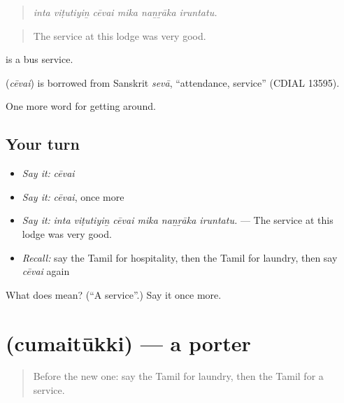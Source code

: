 \begin{quote}
\emph{inta viṭutiyiṉ cēvai mika naṉṟāka iruntatu.}
\end{quote}

\begin{quote}
The service at this lodge was very good.
\end{quote}

  is a bus service.

\begin{cousinweb}
\textbf{} (\emph{cēvai}) is borrowed from Sanskrit \emph{sevā}, \textquotedblleft{}attendance, service\textquotedblright{} (CDIAL 13595).
\end{cousinweb}

\begin{grammarlens}[title={What you've built}]
One more word for getting around.
\end{grammarlens}

\subsection*{Your turn}
\begin{itemize}
\raggedright
  \item \emph{Say it:} \emph{cēvai}
  \item \emph{Say it:} \emph{cēvai}, once more
  \item \emph{Say it:} \emph{inta viṭutiyiṉ cēvai mika naṉṟāka iruntatu.} — The service at this lodge was very good.
  \item \emph{Recall:} say the Tamil for hospitality, then the Tamil for laundry, then say \emph{cēvai} again
\end{itemize}

\begin{tcolorbox}[breakable,colback=teal!4,colframe=teal!35!black,title={Before you move on}]
What does  mean? (\textquotedblleft{}A service\textquotedblright{}.) Say it once more.
\end{tcolorbox}
\section[\texorpdfstring{\ta{சுமைதூக்கி} (cumaitūkki)}{சுமைதூக்கி (cumaitūkki)}]{ (cumaitūkki) — a porter}

\label{lesson:TA-C420-cumaitukki}



\begin{quote}
Before the new one: say the Tamil for laundry, then the Tamil for a service.
\end{quote}


